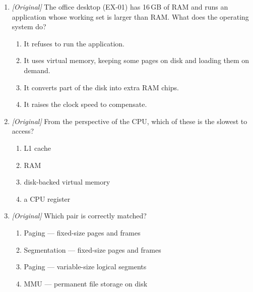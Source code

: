 \begin{enumerate}[label=\textbf{Q\arabic*.}, leftmargin=*]
\begin{enumerate}[label=\Alph*.]
    \item Cache extends RAM using disk; virtual memory speeds up the CPU.
  \end{enumerate}
\item \textit{[Original]} The office desktop (EX-01) has 16\,GB of RAM and
  runs an application whose working set is larger than RAM. What does the
  operating system do?
  \begin{enumerate}[label=\Alph*.]
    \item It refuses to run the application.
    \item It uses virtual memory, keeping some pages on disk and loading them
      on demand.
    \item It converts part of the disk into extra RAM chips.
    \item It raises the clock speed to compensate.
  \end{enumerate}
\item \textit{[Original]} From the perspective of the CPU, which of these is
  the slowest to access?
  \begin{enumerate}[label=\Alph*.]
    \item L1 cache
    \item RAM
    \item disk-backed virtual memory
    \item a CPU register
  \end{enumerate}
\item \textit{[Original]} Which pair is correctly matched?
  \begin{enumerate}[label=\Alph*.]
    \item Paging --- fixed-size pages and frames
    \item Segmentation --- fixed-size pages and frames
    \item Paging --- variable-size logical segments
    \item MMU --- permanent file storage on disk
  \end{enumerate}


\end{enumerate}
